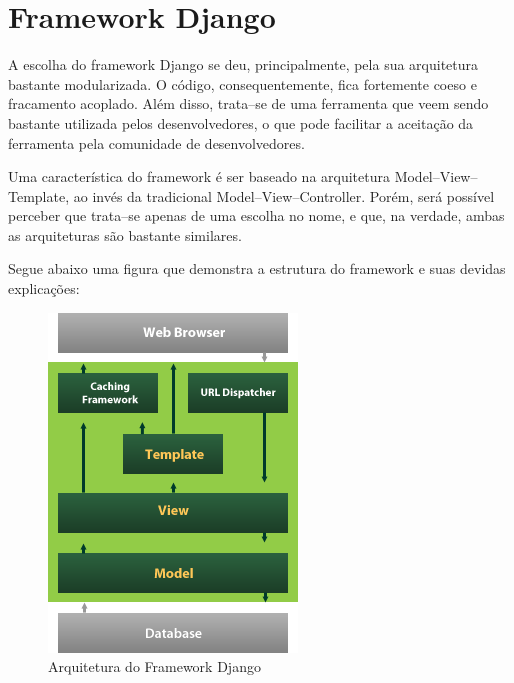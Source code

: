 \documentclass[graduacao,brazil]{ThesisPUC}
\begin{document}
\section{Framework Django}

A escolha do framework Django \cite{Django} se deu, principalmente, pela sua arquitetura bastante modularizada.
O c\'{o}digo, consequentemente, fica fortemente coeso e fracamento acoplado. Al\'{e}m disso, trata--se
de uma ferramenta que veem sendo bastante utilizada pelos desenvolvedores, o que pode facilitar
a aceita\c{c}\~{a}o da ferramenta pela comunidade de desenvolvedores.

Uma caracter\'{i}stica do framework \'{e} ser baseado na arquitetura Model--View--Template, ao inv\'{e}s
da tradicional Model--View--Controller. Por\'{e}m, ser\'{a} poss\'{i}vel perceber que trata--se apenas de
uma escolha no nome, e que, na verdade, ambas as arquiteturas s\~{a}o bastante similares.

Segue abaixo uma figura que demonstra a estrutura do framework e suas devidas explica\c{c}\~{o}es:

\begin{figure}[H]
    \centering
    \includegraphics[width=\linewidth]{Imagens/django_structure.png}
    \caption{Arquitetura do Framework Django}
\end{figure}
\end{document}
